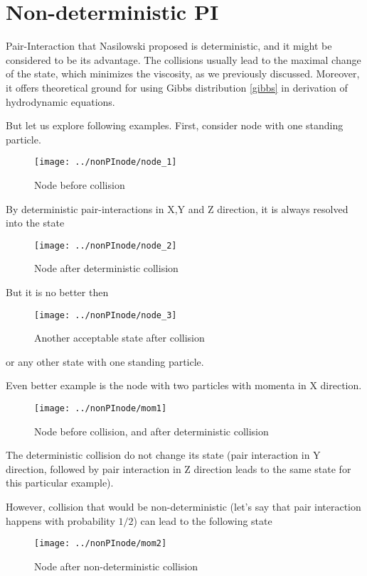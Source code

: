 \chapter{Non-deterministic PI}

Pair-Interaction that Nasilowski proposed is deterministic, and it might be considered to be its advantage. 
The collisions usually lead to the maximal change of the state, which minimizes the viscosity, as we previously discussed.
Moreover, it offers theoretical ground for using Gibbs distribution \ref{gibbs} in derivation of hydrodynamic equations.

\bigskip

But let us explore following examples.
First, consider node with one standing particle.
\begin{figure}[h]
 \centering 
 \texttt{[image: ../nonPInode/node\_1]}
 \label{transitions}
 \caption{Node before collision}
\end{figure}

By deterministic pair-interactions in X,Y and Z direction, it is always resolved into the state
\begin{figure}[h]
 \centering 
 \texttt{[image: ../nonPInode/node\_2]}
 \label{transitions}
 \caption{Node after deterministic collision}
\end{figure}

But it is no better then

\begin{figure}[h]
 \centering 
 \texttt{[image: ../nonPInode/node\_3]}
 \label{transitions}
 \caption{Another acceptable state after collision}
\end{figure}

or any other state with one standing particle.

\bigskip
\newpage
Even better example is the node with two particles with momenta in X direction.
\begin{figure}[htbp]
 \centering 
 \texttt{[image: ../nonPInode/mom1]}
 \label{transitions}
 \caption{Node before collision, and after deterministic collision}
\end{figure}

The deterministic collision do not change its state (pair interaction in Y direction, followed by pair interaction in Z direction leads to the same state for this particular example).

However, collision that would be non-deterministic (let's say that pair interaction happens with probability $1/2$) can lead to the following state
\begin{figure}[htbp]
 \centering 
 \texttt{[image: ../nonPInode/mom2]}
 \label{transitions}
 \caption{Node after non-deterministic collision}
\end{figure}

